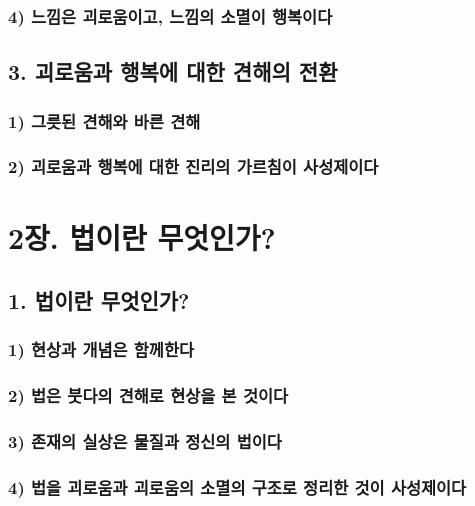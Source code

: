 \documentclass[12pt, a4paper, oneside]{book}
\begin{document}
	\section{4) 느낌은 괴로움이고, 느낌의 소멸이 행복이다}

	\newpage
	\chapter{3. 괴로움과 행복에 대한 견해의 전환}
		\newpage
		\minitoc				%

	\section{1) 그릇된 견해와 바른 견해}
	\section{2) 괴로움과 행복에 대한 진리의 가르침이 사성제이다}




	\part{2장. 법이란 무엇인가?}


	\newpage
	\chapter{1. 법이란 무엇인가?}
	\section{1) 현상과 개념은 함께한다}
	\section{2) 법은 붓다의 견해로 현상을 본 것이다}
	\section{3) 존재의 실상은 물질과 정신의 법이다}
	\section{4) 법을 괴로움과 괴로움의 소멸의 구조로 정리한 것이 사성제이다}
\end{document}
